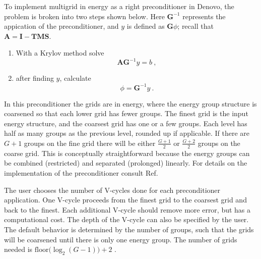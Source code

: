\documentclass[preprint,12pt]{elsarticle}
\newcommand{\ve}[1]{\ensuremath{\mathbf{#1}}}
\begin{document}
To implement multigrid in energy as a right preconditioner in Denovo, the problem is broken into two steps shown below. Here $\ve{G}^{-1}$ represents the appication of the preconditioner, and $y$ is defined as $\ve{G}\phi$; recall that $\ve{A} = \ve{I} - \ve{TMS}$.  
%
\begin{enumerate}
  \item With a Krylov method solve 
    \begin{equation}
      \ve{AG}^{-1}y = b \:, \label{eq:PrecondKrylov} 
    \end{equation}
  \item after finding $y$, calculate 
    \begin{equation}
      \phi = \ve{G}^{-1}y \:. \label{eq:PrecondPhi}
    \end{equation}
\end{enumerate}


In this preconditioner the grids are in energy, where the energy group structure is coarsened so that each lower grid has fewer groups. The finest grid is the input energy structure, and the coarsest grid has one or a few groups. Each level has half as many groups as the previous level, rounded up if applicable. If there are $G+1$ groups on the fine grid there will be either $\frac{G+1}{2}$ or $\frac{G+2}{2}$ groups on the coarse grid. This is conceptually straightforward because the energy groups can be combined (restricted) and separated (prolonged) linearly. For details on the implementation of the preconditioner consult Ref. \cite{Slaybaugh2013}
%

The user chooses the number of V-cycles done for each preconditioner application. One V-cycle proceeds from the finest grid to the coarsest grid and back to the finest. Each additional V-cycle should remove more error, but has a computational cost. The depth of the V-cycle can also be specified by the user. The default behavior is determined by the number of groups, such that the grids will be coarsened until there is only one energy group. The number of grids needed is $\text{floor}\bigl( \log_{2}(G-1) \bigr) + 2$ \cite{BinaryTree2012}.%
\end{document}
